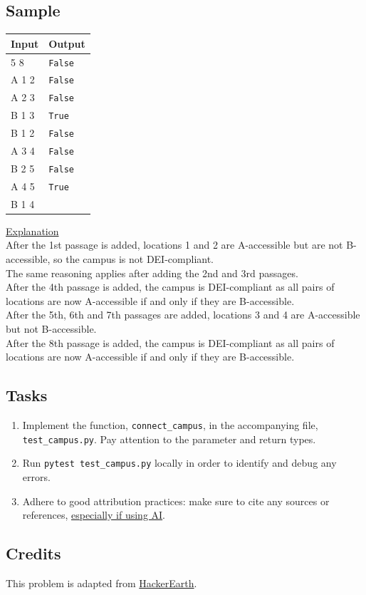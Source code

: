 \documentclass[a4paper]{exam}
\begin{document}
\begin{questions}
  \subsection*{Sample}
  \begin{minipage}[t]{.21\textwidth}
    \begin{tabular}[t]{|l|l|}
      \hline
      Input & Output\\
      \hline
      5 8 & \texttt{False}  \\
      A 1 2 & \texttt{False}  \\
      A 2 3 & \texttt{False}  \\
      B 1 3 & \texttt{True}  \\
      B 1 2 & \texttt{False}  \\
      A 3 4 & \texttt{False}  \\
      B 2 5 & \texttt{False}  \\
      A 4 5 & \texttt{True}  \\
      B 1 4 &   \\
      \hline
    \end{tabular}
  \end{minipage}
  \begin{minipage}[t]{.78\textwidth}
    \underline{Explanation}\\
    After the 1st passage is added, locations 1 and 2 are A-accessible but are not B-accessible, so the campus is not DEI-compliant.\\
    The same reasoning applies after adding the 2nd and 3rd passages.\\
    After the 4th passage is added, the campus is DEI-compliant as all pairs of locations are now A-accessible if and only if they are B-accessible.\\
    After the 5th, 6th and 7th passages are added, locations 3 and 4 are A-accessible but not B-accessible.\\
    After the 8th passage is added,  the campus is DEI-compliant as all pairs of locations are now A-accessible if and only if they are B-accessible.\\
  \end{minipage}

  \subsection*{Tasks}
  \begin{enumerate}
  \item Implement the function, \texttt{connect\_campus}, in the accompanying file, \texttt{test\_campus.py}. Pay attention to the parameter and return types.
  \item Run \texttt{pytest test\_campus.py} locally in order to identify and debug any errors.
  \item Adhere to good attribution practices: make sure to cite any sources or references, \href{https://hulms.instructure.com/courses/2616/discussion_topics/29240}{especially if using AI}.
  \end{enumerate}

  \subsection*{Credits}
  This problem is adapted from \href{https://www.hackerearth.com}{HackerEarth}.
  
\end{questions}
\end{document}
